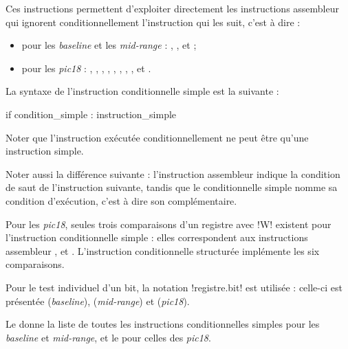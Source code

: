 
Ces instructions permettent d'exploiter directement les instructions assembleur qui ignorent conditionnellement l'instruction qui les suit, c'est à dire :
\begin{itemize}
\item pour les \emph{baseline} et les \emph{mid-range} : , ,  et  ;
\item pour les \emph{pic18} : , , , , , , , ,  et .
\end{itemize}

La syntaxe de l'instruction conditionnelle simple est la suivante :

\begin{piccolo}
if condition_simple : instruction_simple
\end{piccolo}

Noter que l'instruction exécutée conditionnellement ne peut être qu'une instruction simple.

Noter aussi la différence suivante : l'instruction assembleur indique la condition de saut de l'instruction suivante, tandis que le conditionnelle simple nomme sa condition d'exécution, c'est à dire son complémentaire.

Pour les \emph{pic18}, seules trois comparaisons d'un registre avec \pic!W! existent pour l'instruction conditionnelle simple : elles correspondent aux instructions assembleur ,  et . L'instruction conditionnelle structurée implémente les six comparaisons.

Pour le test individuel d'un bit, la notation \pic!registre.bit! est utilisée : celle-ci est présentée  (\emph{baseline}),  (\emph{mid-range}) et  (\emph{pic18}).

Le  donne la liste de toutes les instructions conditionnelles simples pour les \emph{baseline} et \emph{mid-range}, et le  pour celles des \emph{pic18}.

